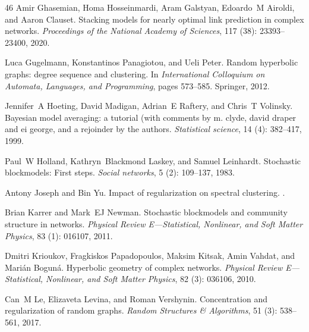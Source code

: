 \documentclass[12pt]{article}
\newcommand{\1}{\mathbf{1}}
\begin{document}
\begin{thebibliography}{46}
Amir Ghasemian, Homa Hosseinmardi, Aram Galstyan, Edoardo~M Airoldi, and Aaron
  Clauset.
\newblock Stacking models for nearly optimal link prediction in complex
  networks.
\newblock \emph{Proceedings of the National Academy of Sciences}, 117
  (38): 23393--23400, 2020.

Luca Gugelmann, Konstantinos Panagiotou, and Ueli Peter.
\newblock Random hyperbolic graphs: degree sequence and clustering.
\newblock In \emph{International Colloquium on Automata, Languages, and
  Programming}, pages 573--585. Springer, 2012.

Jennifer~A Hoeting, David Madigan, Adrian~E Raftery, and Chris~T Volinsky.
\newblock Bayesian model averaging: a tutorial (with comments by m. clyde,
  david draper and ei george, and a rejoinder by the authors.
\newblock \emph{Statistical science}, 14 (4): 382--417, 1999.

Paul~W Holland, Kathryn~Blackmond Laskey, and Samuel Leinhardt.
\newblock Stochastic blockmodels: First steps.
\newblock \emph{Social networks}, 5 (2): 109--137, 1983.

Antony Joseph and Bin Yu.
\newblock Impact of regularization on spectral clustering.
.

Brian Karrer and Mark~EJ Newman.
\newblock Stochastic blockmodels and community structure in networks.
\newblock \emph{Physical Review E—Statistical, Nonlinear, and Soft Matter
  Physics}, 83 (1): 016107, 2011.

Dmitri Krioukov, Fragkiskos Papadopoulos, Maksim Kitsak, Amin Vahdat, and
  Mari{\'a}n Bogun{\'a}.
\newblock Hyperbolic geometry of complex networks.
\newblock \emph{Physical Review E—Statistical, Nonlinear, and Soft Matter
  Physics}, 82 (3): 036106, 2010.

Can~M Le, Elizaveta Levina, and Roman Vershynin.
\newblock Concentration and regularization of random graphs.
\newblock \emph{Random Structures \& Algorithms}, 51 (3):
  538--561, 2017.


\end{thebibliography}
\end{document}
